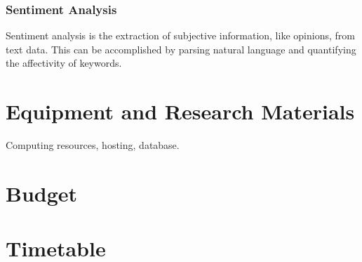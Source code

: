 \documentclass[12pt]{article}
\begin{document}
\begin{doublespacing}

\subsubsection{Sentiment Analysis}
Sentiment analysis is the extraction of subjective information, like opinions, from text data.
This can be accomplished by parsing natural language and quantifying the affectivity of keywords.


\pagebreak
\section{Equipment and Research Materials}

Computing resources, hosting, database.

\pagebreak
\section{Budget}

\pagebreak
\section{Timetable}

\pagebreak
\end{doublespacing}


\end{document}
